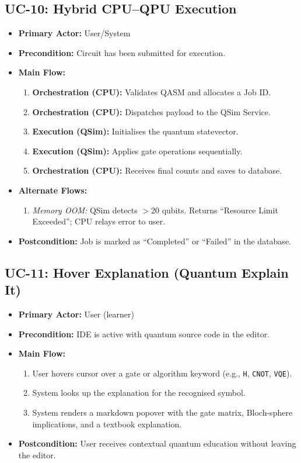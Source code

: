 \subsection{UC-10: Hybrid CPU--QPU Execution}
\begin{itemize}
    \item \textbf{Primary Actor:} User/System
    \item \textbf{Precondition:} Circuit has been submitted for execution.
    \item \textbf{Main Flow:}
    \begin{enumerate}
        \item \textbf{Orchestration (CPU):} Validates QASM and allocates a Job ID.
        \item \textbf{Orchestration (CPU):} Dispatches payload to the QSim Service.
        \item \textbf{Execution (QSim):} Initialises the quantum statevector.
        \item \textbf{Execution (QSim):} Applies gate operations sequentially.
        \item \textbf{Orchestration (CPU):} Receives final counts and saves to database.
    \end{enumerate}
    \item \textbf{Alternate Flows:}
    \begin{enumerate}
        \item [3a] \textit{Memory OOM:} QSim detects $>$20 qubits. Returns ``Resource Limit Exceeded''; CPU relays error to user.
    \end{enumerate}
    \item \textbf{Postcondition:} Job is marked as ``Completed'' or ``Failed'' in the database.
\end{itemize}

\subsection{UC-11: Hover Explanation (Quantum Explain It)}
\begin{itemize}
    \item \textbf{Primary Actor:} User (learner)
    \item \textbf{Precondition:} IDE is active with quantum source code in the editor.
    \item \textbf{Main Flow:}
    \begin{enumerate}
        \item User hovers cursor over a gate or algorithm keyword (e.g., \texttt{H}, \texttt{CNOT}, \texttt{VQE}).
        \item System looks up the explanation for the recognised symbol.
        \item System renders a markdown popover with the gate matrix, Bloch-sphere implications, and a textbook explanation.
    \end{enumerate}
    \item \textbf{Postcondition:} User receives contextual quantum education without leaving the editor.
\end{itemize}

